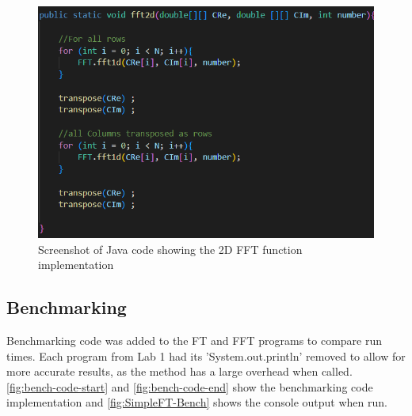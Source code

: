     \begin{figure}[H] 
        \centering
        \includegraphics[width=0.8\columnwidth]{Figures/Week 2/2dFFT Implementation.png}
        \caption{Screenshot of Java code showing the 2D FFT function implementation}
        \label{fig:2dFFT-code}
    \end{figure}

\subsection{Benchmarking}


Benchmarking code was added to the FT and FFT programs to compare run times. Each program from Lab 1 had its 'System.out.println' removed to allow for more accurate results, as the method has a large overhead when called. \autoref{fig:bench-code-start} and \autoref{fig:bench-code-end} show the benchmarking code implementation and \autoref{fig:SimpleFT-Bench} shows the console output when run.


